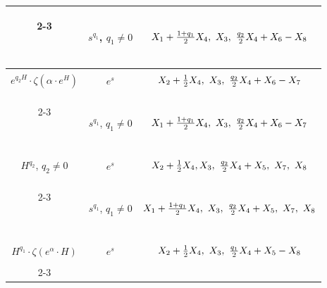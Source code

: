 \begin{center}
\begin{tabular}{|c|c|c|}
\cline{2-3}


\ & $s^{q_1}$, $q_1\ne0$ & $\myrule X_1+\frac{1+q_1}{2}X_4,


\ X_3,\ \frac{q_2}{2}X_4+X_6-X_8$\\


\hline


%


$e^{q_2H}\cdot\zeta(\alpha\cdot e^H)$ & $e^s$ & $\myrule


X_2+\frac12 X_4,\ X_3,\ \frac{q_2}{2}X_4+X_6-X_7$ \\


\cline{2-3}


\ & $s^{q_1}$, $q_1\ne0$ & $\myrule X_1+\frac{1+q_1}{2}X_4,


\ X_3,\ \frac{q_2}{2}X_4+X_6-X_7$ \\


\hline






















%


$H^{q_2}$, $q_2\ne0$ & $e^s$ & $\myrule X_2+\frac12 X_4,


X_3,\ \frac{q_2}{2}X_4+X_5,\ X_7,\ X_8$ \\


\cline{2-3}


\ & $s^{q_1}$, $q_1\ne0$ & $\myrule X_1+\frac{1+q_1}{2}X_4,


\ X_3,\ \frac{q_2}{2}X_4+X_5,\ X_7,\ X_8$ \\


\hline


%


$H^{q_1}\cdot\zeta(e^\alpha\cdot H)$ & $e^s$ & $\myrule


X_2+\frac12 X_4,\ X_3,\ \frac{q_1}{2}X_4+X_5-X_8$ \\


\cline{2-3}



\end{tabular}
\end{center}
